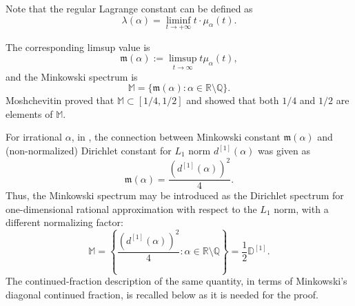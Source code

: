 \documentclass[11pt]{amsart}
\newcommand{\R}{\mathbb R}
\newcommand{\Q}{\mathbb Q}
\newcommand{\MS}{\mathbb M}
\begin{document}
Note that the regular Lagrange constant can be defined as 
$$\lambda(\alpha)= \liminf_{t\to+\infty}t\cdot\mu_\alpha(t).$$

The corresponding limsup value is
$$
        \mathfrak{m}(\alpha):=\limsup_{t\to\infty}t\mu_\alpha(t),
$$
and the Minkowski spectrum is
$$
        \MS=\{\mathfrak{m}(\alpha):\alpha\in\R\setminus\Q\}.
$$
Moshchevitin \cite{MR3025470} proved that $\MS\subset[1/4,1/2]$ and showed that both $1/4$ and $1/2$ are elements of $\MS$.






For irrational $\alpha$, in \cite{moshchevitin2025dirichletimprovabilitylpnorms}, the connection between Minkowski constant $\mathfrak m(\alpha)$ and (non-normalized) Dirichlet constant for $L_1$ norm $d^{[1]}(\alpha)$ was given as
\begin{equation}\label{eq:mink:dir}
        \mathfrak m(\alpha)=\frac{(d^{[1]}(\alpha))^2}{4}.
\end{equation}
Thus, the Minkowski spectrum may be introduced as the Dirichlet spectrum for one-dimensional rational approximation with respect to the $L_1$ norm, with a different normalizing factor:
$$
        \MS=
        \left\{
        \frac{(d^{[1]}(\alpha))^2}{4}:\alpha\in\R\setminus\Q
        \right\} = \frac12 \mathbb{D}^{[1]}.
$$
The continued-fraction description of the same quantity, in terms of Minkowski's diagonal continued fraction, is recalled below as it is needed for the proof.
\end{document}
